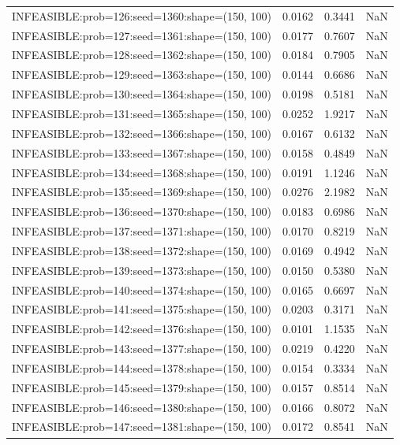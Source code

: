 \begin{longtable}{lccc}
INFEASIBLE:prob=126:seed=1360:shape=(150, 100) &   0.0162 &  0.3441 &    NaN \\
INFEASIBLE:prob=127:seed=1361:shape=(150, 100) &   0.0177 &  0.7607 &    NaN \\
INFEASIBLE:prob=128:seed=1362:shape=(150, 100) &   0.0184 &  0.7905 &    NaN \\
INFEASIBLE:prob=129:seed=1363:shape=(150, 100) &   0.0144 &  0.6686 &    NaN \\
INFEASIBLE:prob=130:seed=1364:shape=(150, 100) &   0.0198 &  0.5181 &    NaN \\
INFEASIBLE:prob=131:seed=1365:shape=(150, 100) &   0.0252 &  1.9217 &    NaN \\
INFEASIBLE:prob=132:seed=1366:shape=(150, 100) &   0.0167 &  0.6132 &    NaN \\
INFEASIBLE:prob=133:seed=1367:shape=(150, 100) &   0.0158 &  0.4849 &    NaN \\
INFEASIBLE:prob=134:seed=1368:shape=(150, 100) &   0.0191 &  1.1246 &    NaN \\
INFEASIBLE:prob=135:seed=1369:shape=(150, 100) &   0.0276 &  2.1982 &    NaN \\
INFEASIBLE:prob=136:seed=1370:shape=(150, 100) &   0.0183 &  0.6986 &    NaN \\
INFEASIBLE:prob=137:seed=1371:shape=(150, 100) &   0.0170 &  0.8219 &    NaN \\
INFEASIBLE:prob=138:seed=1372:shape=(150, 100) &   0.0169 &  0.4942 &    NaN \\
INFEASIBLE:prob=139:seed=1373:shape=(150, 100) &   0.0150 &  0.5380 &    NaN \\
INFEASIBLE:prob=140:seed=1374:shape=(150, 100) &   0.0165 &  0.6697 &    NaN \\
INFEASIBLE:prob=141:seed=1375:shape=(150, 100) &   0.0203 &  0.3171 &    NaN \\
INFEASIBLE:prob=142:seed=1376:shape=(150, 100) &   0.0101 &  1.1535 &    NaN \\
INFEASIBLE:prob=143:seed=1377:shape=(150, 100) &   0.0219 &  0.4220 &    NaN \\
INFEASIBLE:prob=144:seed=1378:shape=(150, 100) &   0.0154 &  0.3334 &    NaN \\
INFEASIBLE:prob=145:seed=1379:shape=(150, 100) &   0.0157 &  0.8514 &    NaN \\
INFEASIBLE:prob=146:seed=1380:shape=(150, 100) &   0.0166 &  0.8072 &    NaN \\
INFEASIBLE:prob=147:seed=1381:shape=(150, 100) &   0.0172 &  0.8541 &    NaN \\

\end{longtable}
